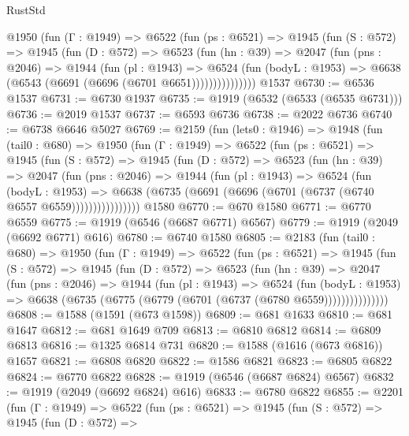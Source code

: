 \begin{lexlean}{RustStd}
\begin{coremodule}
        @1950
          (fun (Γ : @1949) =>
          @6522
            (fun (ps : @6521) =>
            @1945
              (fun (S : @572) =>
              @1945
                (fun (D : @572) =>
                @6523
                  (fun (hn : @39) =>
                  @2047
                    (fun (pns : @2046) =>
                    @1944
                      (fun (pl : @1943) =>
                      @6524
                        (fun (bodyL : @1953) =>
                        @6638 (@6543 (@6691 (@6696 (@6701 @6651)))))))))))))))
    @1537
@6730 := @6536 @1537
@6731 := @6730 @1937
@6735 := @1919 (@6532 (@6533 (@6535 @6731)))
@6736 := @2019 @1537
@6737 := @6593 @6736
@6738 := @2022 @6736
@6740 := @6738 @6646 @5027
@6769 := @2159
    (fun (lets0 : @1946) =>
    @1948
      (fun (tail0 : @680) =>
      @1950
        (fun (Γ : @1949) =>
        @6522
          (fun (ps : @6521) =>
          @1945
            (fun (S : @572) =>
            @1945
              (fun (D : @572) =>
              @6523
                (fun (hn : @39) =>
                @2047
                  (fun (pns : @2046) =>
                  @1944
                    (fun (pl : @1943) =>
                    @6524
                      (fun (bodyL : @1953) =>
                      @6638 (@6735 (@6691 (@6696 (@6701 (@6737 (@6740 @6557 @6559))))))))))))))))
    @1580
@6770 := @670 @1580
@6771 := @6770 @6559
@6775 := @1919 (@6546 (@6687 @6771) @6567)
@6779 := @1919 (@2049 (@6692 @6771) @616)
@6780 := @6740 @1580
@6805 := @2183
    (fun (tail0 : @680) =>
    @1950
      (fun (Γ : @1949) =>
      @6522
        (fun (ps : @6521) =>
        @1945
          (fun (S : @572) =>
          @1945
            (fun (D : @572) =>
            @6523
              (fun (hn : @39) =>
              @2047
                (fun (pns : @2046) =>
                @1944
                  (fun (pl : @1943) =>
                  @6524
                    (fun (bodyL : @1953) =>
                    @6638 (@6735 (@6775 (@6779 (@6701 (@6737 (@6780 @6559)))))))))))))))
@6808 := @1588 (@1591 (@673 @1598))
@6809 := @681 @1633
@6810 := @681 @1647
@6812 := @681 @1649 @709
@6813 := @6810 @6812
@6814 := @6809 @6813
@6816 := @1325 @6814 @731
@6820 := @1588 (@1616 (@673 @6816)) @1657
@6821 := @6808 @6820
@6822 := @1586 @6821
@6823 := @6805 @6822
@6824 := @6770 @6822
@6828 := @1919 (@6546 (@6687 @6824) @6567)
@6832 := @1919 (@2049 (@6692 @6824) @616)
@6833 := @6780 @6822
@6855 := @2201
    (fun (Γ : @1949) =>
    @6522
      (fun (ps : @6521) =>
      @1945
        (fun (S : @572) =>
        @1945
          (fun (D : @572) =>

\end{coremodule}
\end{lexlean}
